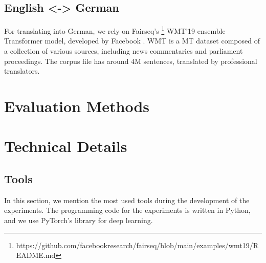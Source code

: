 \subsection{English <-> German}
For translating into German, we rely on Fairseq's \footnote{https://github.com/facebookresearch/fairseq/blob/main/examples/wmt19/README.md} WMT’19 ensemble Transformer model, developed by Facebook \parencite{WMT19}. WMT is a MT dataset composed of a collection of various sources, including news commentaries and parliament proceedings. The corpus file has around 4M sentences, translated by professional translators.


\section{Evaluation Methods}
\label{sec:Experiments:Evaluation}



\section{Technical Details}
\label{sec:Experiments:Technical}

\subsection{Tools}
\label{sec:Experiments:Tools}

In this section, we mention the most used tools during the development of the experiments. The programming code for the experiments is written in Python, and we use PyTorch's library for deep learning.

